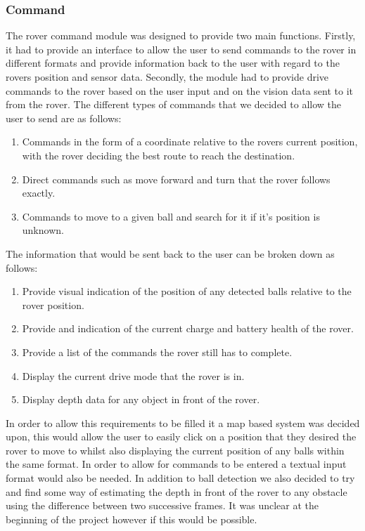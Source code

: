 \documentclass[10pt,twoside]{article}
\begin{document}
\subsubsection{Command}
The rover command module was designed to provide two main functions. Firstly, it had to provide an interface to allow the user to send commands to the rover in different formats and provide information back to the user with regard to the rovers position and sensor data. Secondly, the module had to provide drive commands to the rover based on the user input and on the vision data sent to it from the rover. 
\smallbreak
The different types of commands that we decided to allow the user to send are as follows:
\begin{enumerate}
  \item Commands in the form of a coordinate relative to the rovers current position, with the rover deciding the best route to reach the destination.
  \item Direct commands such as move forward and turn that the rover follows exactly.
  \item Commands to move to a given ball and search for it if it's position is unknown. 
\end{enumerate}
The information that would be sent back to the user can be broken down as follows:
\begin{enumerate}
  \item Provide visual indication of the position of any detected balls relative to the rover position.
  \item Provide and indication of the current charge and battery health of the rover.
  \item Provide a list of the commands the rover still has to complete.
  \item Display the current drive mode that the rover is in.
  \item Display depth data for any object in front of the rover.
\end{enumerate}
In order to allow this requirements to be filled it a map based system was decided upon, this would allow the user to easily click on a position that they desired the rover to move to whilst also displaying the current position of any balls within the same format. In order to allow for commands to be entered a textual input format would also be needed. In addition to ball detection we also decided to try and find some way of estimating the depth in front of the rover to any obstacle using the difference between two successive frames. It was unclear at the beginning of the project however if this would be possible.
\end{document}
